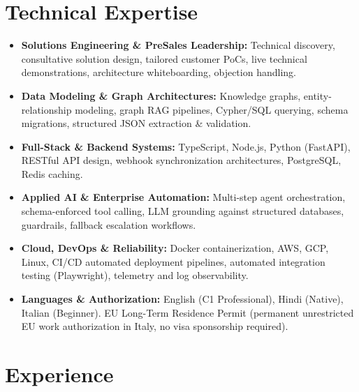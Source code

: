 \documentclass[10pt,a4paper]{article}
\begin{document}
\section{Technical Expertise}
\begin{itemize}
  \item \textbf{Solutions Engineering \& PreSales Leadership:} Technical discovery, consultative solution design, tailored customer PoCs, live technical demonstrations, architecture whiteboarding, objection handling.
  \item \textbf{Data Modeling \& Graph Architectures:} Knowledge graphs, entity-relationship modeling, graph RAG pipelines, Cypher/SQL querying, schema migrations, structured JSON extraction \& validation.
  \item \textbf{Full-Stack \& Backend Systems:} TypeScript, Node.js, Python (FastAPI), RESTful API design, webhook synchronization architectures, PostgreSQL, Redis caching.
  \item \textbf{Applied AI \& Enterprise Automation:} Multi-step agent orchestration, schema-enforced tool calling, LLM grounding against structured databases, guardrails, fallback escalation workflows.
  \item \textbf{Cloud, DevOps \& Reliability:} Docker containerization, AWS, GCP, Linux, CI/CD automated deployment pipelines, automated integration testing (Playwright), telemetry and log observability.
  \item \textbf{Languages \& Authorization:} English (C1 Professional), Hindi (Native), Italian (Beginner). EU Long-Term Residence Permit (permanent unrestricted EU work authorization in Italy, no visa sponsorship required).
\end{itemize}

\section{Experience}
\end{document}
